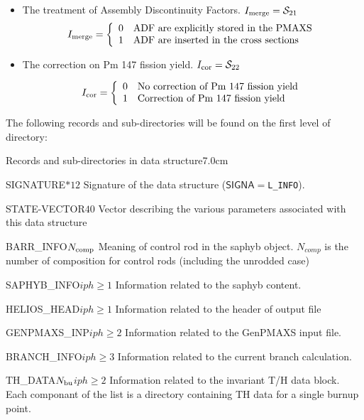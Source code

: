\begin{itemize}
\item The treatment of Assembly Discontinuity Factors. $I_{\rm merge} = \mathcal{S}_{21}$
\begin{displaymath} I_{\rm merge} = \left\{
\begin{array}{rl}
 0 & \textrm{ADF are explicitly stored in the PMAXS} \\
 1 & \textrm{ADF are inserted in the cross sections} \\
\end{array} \right.
\end{displaymath}


\item The correction on Pm 147 fission yield. $I_{\rm cor} = \mathcal{S}_{22}$

\begin{displaymath} I_{\rm cor} = \left\{
\begin{array}{rl}
 0 & \textrm{No correction of Pm 147 fission yield} \\
 1 & \textrm{Correction of Pm 147 fission yield} \\
\end{array} \right.
\end{displaymath}
\end{itemize}
\clearpage
\noindent
The following records and sub-directories will be found on the first level of 
directory:

\begin{DescriptionEnregistrement}{Records and sub-directories
 in  data structure}{7.0cm} \label{tabl:tabinfo}

\CharEnr
 {SIGNATURE}{$*12$}
 {Signature of the  data structure ($\mathsf{SIGNA}=${\tt L\_INFO}).}

  \IntEnr
  {STATE-VECTOR}{$40$}
  { Vector describing the various parameters associated with this data structure}

\IntEnr
  {BARR\_INFO}{$N_{\rm comp}$}
  { Meaning of control rod in the saphyb object. $N_{comp}$ is the number of composition for control rods (including the unrodded case)}
  

  
\OptDirEnr
 {SAPHYB\_INFO}{$iph\geq 1$}
 {Information related to the saphyb content.}  
 
 \OptDirEnr
 {HELIOS\_HEAD}{$iph\geq 1$}
 {Information related to the header of output  file}  
 
 \OptDirEnr
 {GENPMAXS\_INP}{$iph\geq 2$}
 {Information related to the GenPMAXS input file.}  
 
 \OptDirEnr
 {BRANCH\_INFO}{$iph\geq 3$}
 {Information related to the current branch calculation.}  
 
 \OptDirlEnr
 {TH\_DATA}{$N_{\rm bu}$}{$iph\geq 2$}
 {Information related to the invariant T/H data block. Each componant of the list is a directory containing TH data for a single burnup point.}  

\end{DescriptionEnregistrement}

